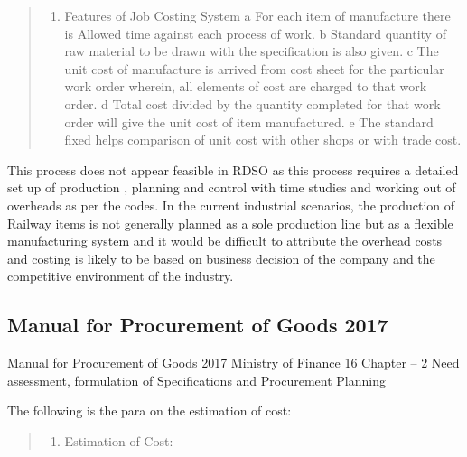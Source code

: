 \documentclass[
  10pt,
  twoside]{article}
\providecommand{\tightlist}{%
  \setlength{\itemsep}{0pt}\setlength{\parskip}{0pt}}
\begin{document}
\begin{quote}
\begin{enumerate}
\def\labelenumi{\arabic{enumi}.}
\setcounter{enumi}{604}
\tightlist
\item
  Features of Job Costing System a For each item of manufacture there is
  Allowed time against each process of work. b Standard quantity of raw
  material to be drawn with the specification is also given. c The unit
  cost of manufacture is arrived from cost sheet for the particular work
  order wherein, all elements of cost are charged to that work order. d
  Total cost divided by the quantity completed for that work order will
  give the unit cost of item manufactured. e The standard fixed helps
  comparison of unit cost with other shops or with trade cost.
\end{enumerate}
\end{quote}

This process does not appear feasible in RDSO as this process requires a
detailed set up of production , planning and control with time studies
and working out of overheads as per the codes. In the current industrial
scenarios, the production of Railway items is not generally planned as a
sole production line but as a flexible manufacturing system and it would
be difficult to attribute the overhead costs and costing is likely to be
based on business decision of the company and the competitive
environment of the industry.

\hypertarget{manual-for-procurement-of-goods-2017}{%
\subsection{Manual for Procurement of Goods
2017}\label{manual-for-procurement-of-goods-2017}}

Manual for Procurement of Goods 2017 Ministry of Finance 16 Chapter -- 2
Need assessment, formulation of Specifications and Procurement Planning

The following is the para on the estimation of cost:

\begin{quote}
\begin{enumerate}
\def\labelenumi{\alph{enumi})}
\setcounter{enumi}{4}
\tightlist
\item
  Estimation of Cost:
\end{enumerate}
\end{quote}
\end{document}
